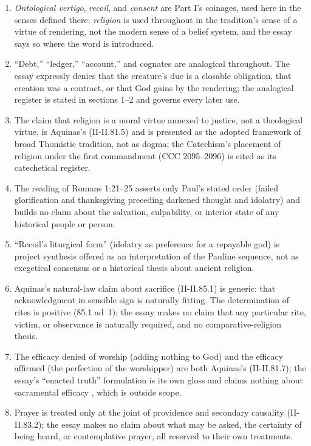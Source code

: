 \begin{enumerate}[leftmargin=1.45em,itemsep=0.25em]
\item \emph{Ontological vertigo}, \emph{recoil}, and \emph{consent} are Part I's coinages, used here in the senses defined there; \emph{religion} is used throughout in the tradition's sense of a virtue of rendering, not the modern sense of a belief system, and the essay says so where the word is introduced.
\item ``Debt,'' ``ledger,'' ``account,'' and cognates are analogical throughout. The essay expressly denies that the creature's due is a closable obligation, that creation was a contract, or that God gains by the rendering; the analogical register is stated in sections 1--2 and governs every later use.
\item The claim that religion is a moral virtue annexed to justice, not a theological virtue, is Aquinas's (II-II.81.5) and is presented as the adopted framework of broad Thomistic tradition, not as dogma; the Catechism's placement of religion under the first commandment (CCC 2095--2096) is cited as its catechetical register.
\item The reading of Romans 1:21--25 asserts only Paul's stated order (failed glorification and thanksgiving preceding darkened thought and idolatry) and builds no claim about the salvation, culpability, or interior state of any historical people or person.
\item ``Recoil's liturgical form'' (idolatry as preference for a repayable god) is project synthesis offered as an interpretation of the Pauline sequence, not as exegetical consensus or a historical thesis about ancient religion.
\item Aquinas's natural-law claim about sacrifice (II-II.85.1) is generic: that acknowledgment in sensible sign is naturally fitting. The determination of rites is positive (85.1 ad~1); the essay makes no claim that any particular rite, victim, or observance is naturally required, and no comparative-religion thesis.
\item The efficacy denied of worship (adding nothing to God) and the efficacy affirmed (the perfection of the worshipper) are both Aquinas's (II-II.81.7); the essay's ``enacted truth'' formulation is its own gloss and claims nothing about sacramental efficacy , which is outside scope.
\item Prayer is treated only at the joint of providence and secondary causality (II-II.83.2); the essay makes no claim about what may be asked, the certainty of being heard, or contemplative prayer, all reserved to their own treatments.

\end{enumerate}
